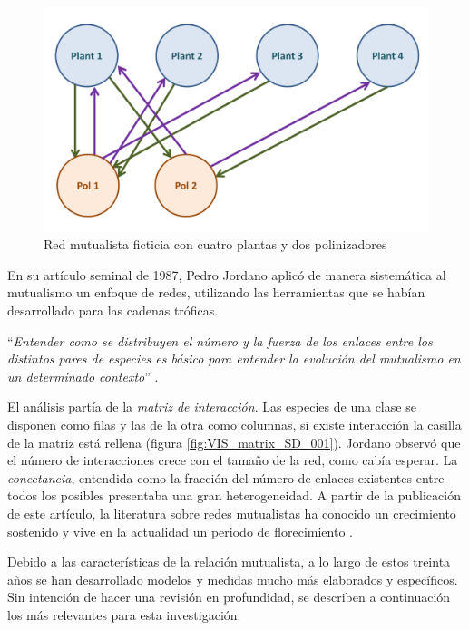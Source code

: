 \begin{figure}[h!]
\centering
\includegraphics[scale=0.30]{Figures/INTRO_bip_ficticia.png}
\caption{Red mutualista ficticia con cuatro plantas y dos polinizadores}
\label{fig:INTRO_bip_ficticia}
\end{figure}

En su artículo seminal de 1987, Pedro Jordano aplicó de manera sistemática al mutualismo un enfoque de redes, utilizando las herramientas que se habían desarrollado para las cadenas tróficas.

\enquote{\itshape Entender como se distribuyen el número y la fuerza de los enlaces entre los distintos pares de especies es básico para entender la evolución del mutualismo en un determinado contexto} \cite{jordano1987patterns}.

El análisis partía de la \textit{matriz de interacción}. Las especies de una clase se disponen como filas y las de la otra como columnas, si existe interacción la casilla de la matriz está rellena (figura \ref{fig:VIS_matrix_SD_001}). Jordano observó que el número de interacciones crece con el tamaño de la red, como cabía esperar. La \textit{conectancia}, entendida como la fracción del número de enlaces existentes entre todos los posibles presentaba una gran heterogeneidad. A partir de la publicación de este artículo, la literatura sobre redes mutualistas ha conocido un crecimiento sostenido y vive en la actualidad un periodo de florecimiento \cite{gu2015emerging}.

Debido a las características de la relación mutualista, a lo largo de estos treinta años se han desarrollado modelos y medidas mucho más elaborados y específicos. Sin intención de hacer una revisión en profundidad, se describen a continuación los más relevantes para esta investigación.

